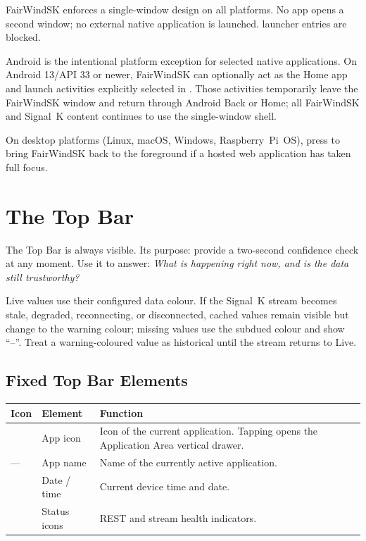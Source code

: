 FairWindSK enforces a single-window design on all platforms.
No app opens a second window; no external native application is launched.
 launcher entries are blocked.

Android is the intentional platform exception for selected native applications.
On Android 13/API 33 or newer, FairWindSK can optionally act as the Home app and
launch activities explicitly selected in . Those activities
temporarily leave the FairWindSK window and return through Android Back or Home;
all FairWindSK and Signal~K content continues to use the single-window shell.

On desktop platforms (Linux, macOS, Windows, Raspberry~Pi~OS),
press  to bring FairWindSK back to the foreground if a hosted web
application has taken full focus.

\chapter{The Top Bar}
\label{ch:topbar}

The Top Bar is always visible.
Its purpose: provide a two-second confidence check at any moment.
Use it to answer: \textit{What is happening right now, and is the data still
trustworthy?}

Live values use their configured data colour. If the Signal~K stream becomes stale,
degraded, reconnecting, or disconnected, cached values remain visible but change to
the warning colour; missing values use the subdued colour and show ``--''. Treat a
warning-coloured value as historical until the stream returns to Live.


\section{Fixed Top Bar Elements}

\begin{longtable}{C{1.5cm}L{2.8cm}L{9.4cm}}
\toprule
{}
\color{white}\sffamily\bfseries Icon &
\color{white}\sffamily\bfseries Element &
\color{white}\sffamily\bfseries Function \\
\midrule
{}       & App icon    &
  Icon of the current application.
  Tapping opens the Application Area vertical drawer. \\
---                     & App name    &
  Name of the currently active application. \\
     & Date / time &
  Current device time and date. \\
& Status icons &
  REST and stream health indicators. \\
\bottomrule
\end{longtable}

